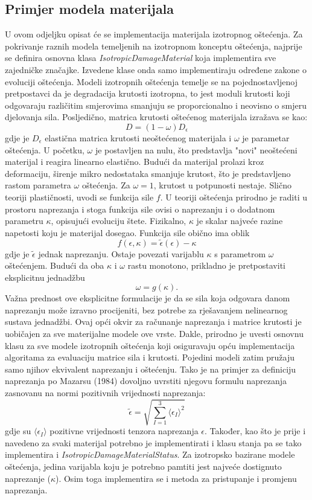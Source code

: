 \documentclass[a4paper,twoside,12pt]{memoir} %
\begin{document}
\subsection{Primjer modela materijala}
U ovom odjeljku opisat će se implementacija materijala izotropnog oštećenja. Za pokrivanje raznih modela temeljenih na izotropnom konceptu oštećenja, najprije se definira osnovna klasa \textit{IsotropicDamageMaterial} koja implementira sve zajedničke značajke. Izvedene klase onda samo implementiraju određene zakone o evoluciji oštećenja.
Modeli izotropnih oštećenja temelje se na pojednostavljenoj pretpostavci da je degradacija krutosti izotropna, to jest moduli krutosti koji odgovaraju različitim smjerovima smanjuju se proporcionalno i neovisno o smjeru djelovanja sila. Posljedično, matrica krutosti oštećenog materijala izražava se kao:
$$ D = (1 - \omega)  D_\epsilon$$
gdje je $D_\epsilon$ elastična matrica krutosti neoštećenog materijala i $\omega$ je parametar oštećenja. U početku, $\omega$ je postavljen na nulu, što predstavlja "novi" neoštećeni materijal i reagira linearno elastično. Budući da materijal prolazi kroz deformaciju, širenje mikro nedostataka smanjuje krutost, što je predstavljeno rastom parametra $\omega$ oštećenja. Za $\omega = 1$, krutost u potpunosti nestaje. 
Slično teoriji plastičnosti, uvodi se funkcija sile $f$. U teoriji oštećenja prirodno je raditi u prostoru naprezanja i stoga funkcija sile ovisi o naprezanju i o dodatnom parametru $\kappa$, opisujući evoluciju štete. Fizikalno, $\kappa$ je skalar najveće razine napetosti koju je materijal dosegao. Funkcija sile obično ima oblik 
$$f(\epsilon, \kappa) = \widetilde{\epsilon} (\epsilon) - \kappa$$
gdje je $\widetilde{\epsilon}$ jednak naprezanju. Ostaje povezati varijablu $\kappa$ s parametrom $\omega$ oštećenjem. Budući da oba $\kappa$ i $\omega$ rastu monotono, prikladno je pretpostaviti eksplicitnu jednadžbu
$$ \omega = g(\kappa) .$$
Važna prednost ove eksplicitne formulacije je da se sila koja odgovara danom naprezanju može izravno procijeniti, bez potrebe za rješavanjem nelinearnog sustava jednadžbi.
Ovaj opći okvir za računanje naprezanja i matrice krutosti je uobičajen za sve materijalne modele ove vrste. Dakle, prirodno je uvesti osnovnu klasu za sve modele izotropnih oštećenja koji osiguravaju opću implementacija algoritama za evaluaciju matrice sila i krutosti. Pojedini modeli zatim pružaju samo njihov ekvivalent naprezanju i oštećenju. Tako je na primjer za definiciju naprezanja po Mazarsu (1984) dovoljno uvrstiti njegovu formulu naprezanja zasnovanu na normi pozitivnih vrijednosti naprezanja:
$$ \widetilde{\epsilon} = \sqrt{\sum^3_{I=1} \langle \epsilon_I \rangle^2 }$$
gdje su $\langle \epsilon_I \rangle$ pozitivne vrijednosti tenzora naprezanja $\epsilon$. 
Također, kao što je prije i navedeno za svaki materijal potrebno je implementirati i klasu stanja pa se tako implementira i \textit{IsotropicDamageMaterialStatus}. Za izotropsko bazirane modele oštećenja, jedina varijabla koju je potrebno pamtiti jest najveće dostignuto naprezanje ($\kappa$). Osim toga implementira se i metoda za pristupanje i promjenu naprezanja.
\end{document}

